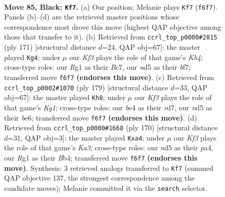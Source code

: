 \documentclass[11pt]{article}
\begin{document}
\clearpage

\begin{figure}[p]\centering
\begin{subfigure}{0.46\textwidth}\centering
\resizebox{\linewidth}{!}{%
\newchessgame
\chessboard[
  setfen={1B6/3b4/5k2/1P1N4/P3B3/3K3p/1R6/6r1 b - - 10 85},
  showmover=false,
  pgfstyle=straightmove, color=movearrow, markmove={f6-f7}
]}
\caption{}
\end{subfigure}\hfill
\begin{subfigure}{0.46\textwidth}\centering
\resizebox{\linewidth}{!}{%
\newchessgame
\chessboard[
  setfen={8/2bP1B2/2b5/7k/4p2P/1P6/4KB2/8 b - - 14 86},
  showmover=false,
  pgfstyle=straightmove, color=movearrow, markmove={h5-g4}
]}
\caption{}
\end{subfigure}
\\[4pt]
\begin{subfigure}{0.46\textwidth}\centering
\resizebox{\linewidth}{!}{%
\newchessgame
\chessboard[
  setfen={6k1/3R4/4Bp2/7p/4P2P/6P1/1r3b2/3K4 b - - 8 90},
  showmover=false,
  pgfstyle=straightmove, color=movearrow, markmove={g8-h8}
]}
\caption{}
\end{subfigure}\hfill
\begin{subfigure}{0.46\textwidth}\centering
\resizebox{\linewidth}{!}{%
\newchessgame
\chessboard[
  setfen={4r1k1/2R5/7p/6bP/pB4P1/K7/8/8 w - - 19 86},
  showmover=false,
  pgfstyle=straightmove, color=movearrow, markmove={a3-a4}
]}
\caption{}
\end{subfigure}
\caption{\textbf{Move 85, Black: \texttt{Kf7}.} (a) Our position; Melanie plays \texttt{Kf7} (\texttt{f6f7}). Panels (b)--(d) are the retrieved master positions whose correspondence most drove this move (highest QAP objective among those that transfer to it). (b) Retrieved from \texttt{ccrl\_top\_p0000\#2815} (ply 171) [structural distance $d$=24, QAP obj=67]: the master played \texttt{Kg4}; under $\mu$ our \emph{Kf3} plays the role of that game's \emph{Kh4}; cross-type roles: our \emph{R}g1 as their \emph{B}c7, our \emph{n}d5 as their \emph{b}f7; transferred move \texttt{f6f7} \textbf{(endorses this move)}. (c) Retrieved from \texttt{ccrl\_top\_p0002\#1070} (ply 179) [structural distance $d$=33, QAP obj=67]: the master played \texttt{Kh8}; under $\mu$ our \emph{Kf3} plays the role of that game's \emph{Kg1}; cross-type roles: our \emph{b}e4 as their \emph{r}d7, our \emph{n}d5 as their \emph{b}e6; transferred move \texttt{f6f7} \textbf{(endorses this move)}. (d) Retrieved from \texttt{ccrl\_top\_p0000\#1668} (ply 170) [structural distance $d$=31, QAP obj=3]: the master played \texttt{Kxa4}; under $\mu$ our \emph{Kf3} plays the role of that game's \emph{Ka3}; cross-type roles: our \emph{n}d5 as their \emph{p}a4, our \emph{R}g1 as their \emph{B}b4; transferred move \texttt{f6f7} \textbf{(endorses this move)}. Synthesis: 3 retrieved analogs transferred to \texttt{Kf7} (summed QAP objective 137, the strongest correspondence among the candidate moves); Melanie committed it via the \texttt{search} selector.}
\label{fig:thought-m169}
\end{figure}
\end{document}
